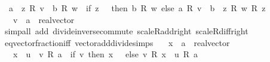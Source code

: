 \begin{isabellebody}
\ \ {\isachardoublequoteopen}{\isacharparenleft}{\kern0pt}a\ {\isacharslash}{\kern0pt}\ z{\isacharparenright}{\kern0pt}\ {\isacharasterisk}{\kern0pt}\isactrlsub R\ v\ {\isacharminus}{\kern0pt}\ b\ {\isacharasterisk}{\kern0pt}\isactrlsub R\ w\ {\isacharequal}{\kern0pt}\ {\isacharparenleft}{\kern0pt}if\ z\ {\isacharequal}{\kern0pt}\ {}\ then\ {\isacharminus}{\kern0pt}b\ {\isacharasterisk}{\kern0pt}\isactrlsub R\ w\ else\ {\isacharparenleft}{\kern0pt}a\ {\isacharasterisk}{\kern0pt}\isactrlsub R\ v\ {\isacharminus}{\kern0pt}\ {\isacharparenleft}{\kern0pt}b\ {\isacharasterisk}{\kern0pt}\ z{\isacharparenright}{\kern0pt}\ {\isacharasterisk}{\kern0pt}\isactrlsub R\ w{\isacharparenright}{\kern0pt}\ {\isacharslash}{\kern0pt}\isactrlsub R\ z{\isacharparenright}{\kern0pt}{\isachardoublequoteclose}\isanewline
\ \ \ v\ {\isacharcolon}{\kern0pt}{\isacharcolon}{\kern0pt}\ {\isachardoublequoteopen}{\isacharprime}{\kern0pt}a\ {\isacharcolon}{\kern0pt}{\isacharcolon}{\kern0pt}\ real{\isacharunderscore}{\kern0pt}vector{\isachardoublequoteclose}\isanewline
%
\isadelimproof
\ \ %
\endisadelimproof
%
\isatagproof
{}\isamarkupfalse%
\ {\isacharparenleft}{\kern0pt}simp{\isacharunderscore}{\kern0pt}all\ add{\isacharcolon}{\kern0pt}\ divide{\isacharunderscore}{\kern0pt}inverse{\isacharunderscore}{\kern0pt}commute\ scaleR{\isacharunderscore}{\kern0pt}add{\isacharunderscore}{\kern0pt}right\ scaleR{\isacharunderscore}{\kern0pt}diff{\isacharunderscore}{\kern0pt}right{\isacharparenright}{\kern0pt}%
\endisatagproof
{\isafoldproof}%
%
\isadelimproof
\isanewline
%
\endisadelimproof
\isanewline
\isanewline
{}\isamarkupfalse%
\ eq{\isacharunderscore}{\kern0pt}vector{\isacharunderscore}{\kern0pt}fraction{\isacharunderscore}{\kern0pt}iff\ {\isacharbrackleft}{\kern0pt}vector{\isacharunderscore}{\kern0pt}add{\isacharunderscore}{\kern0pt}divide{\isacharunderscore}{\kern0pt}simps{\isacharbrackright}{\kern0pt}{\isacharcolon}{\kern0pt}\isanewline
\ \ \ x\ {\isacharcolon}{\kern0pt}{\isacharcolon}{\kern0pt}\ {\isachardoublequoteopen}{\isacharprime}{\kern0pt}a\ {\isacharcolon}{\kern0pt}{\isacharcolon}{\kern0pt}\ real{\isacharunderscore}{\kern0pt}vector{\isachardoublequoteclose}\isanewline
\ \ \ {\isachardoublequoteopen}{\isacharparenleft}{\kern0pt}x\ {\isacharequal}{\kern0pt}\ {\isacharparenleft}{\kern0pt}u\ {\isacharslash}{\kern0pt}\ v{\isacharparenright}{\kern0pt}\ {\isacharasterisk}{\kern0pt}\isactrlsub R\ a{\isacharparenright}{\kern0pt}\ {\isasymlongleftrightarrow}\ {\isacharparenleft}{\kern0pt}if\ v{\isacharequal}{\kern0pt}{}\ then\ x\ {\isacharequal}{\kern0pt}\ {}\ else\ v\ {\isacharasterisk}{\kern0pt}\isactrlsub R\ x\ {\isacharequal}{\kern0pt}\ u\ {\isacharasterisk}{\kern0pt}\isactrlsub R\ a{\isacharparenright}{\kern0pt}{\isachardoublequoteclose}\isanewline

\end{isabellebody}
